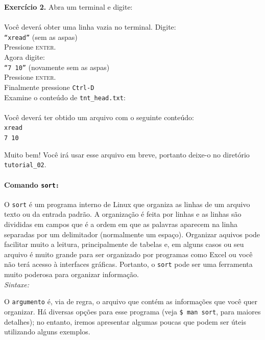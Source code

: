 \begin{refsection}
\begin{blackBlock}{\textbf{Exercício 2.}}
Abra um terminal e digite:\\
\\

Você deverá obter uma linha vazia no terminal. Digite:\\
\texttt{``xread''} (sem as aspas)\\
Pressione \textsc{enter}.\\
Agora digite:\\
\texttt{``7 10''} (novamente sem as aspas)\\
Pressione \textsc{enter}.\\
Finalmente pressione  \texttt{Ctrl-D}\\

Examine o conteúdo de \texttt{tnt\_head.txt}:\\
\\

Você deverá ter obtido um arquivo com o seguinte conteúdo:\\
\texttt{xread}\\
\texttt{7 10}\\
\end{blackBlock}

Muito bem! Você irá usar esse arquivo em breve, portanto deixe-o no diretório \texttt{tutorial\_02}.\\

\paragraph{Comando \texttt{sort:}}\label{tut2:text:editors:texttools:sort}
O \texttt{sort} é um programa interno de Linux que organiza as linhas de um arquivo texto ou da entrada padrão. A organização é feita por linhas e as linhas são divididas em campos que é a ordem em que as palavras aparecem na linha separadas por um delimitador (normalmente um espaço). Organizar aquivos pode facilitar muito a leitura, principalmente de tabelas e, em alguns casos ou seu arquivo é muito grande para ser organizado por programas como Excel ou você não terá acesso à interfaces gráficas. Portanto, o \texttt{sort} pode ser uma ferramenta muito poderosa para organizar informação.\\

\textit{Sintaxe:}\\

O \texttt{argumento} é, via de regra, o arquivo que contém as informações que você quer organizar. Há diversas opções para esse programa (veja \texttt{\$ man sort}, para maiores detalhes); no entanto, iremos apresentar algumas poucas que podem ser úteis utilizando alguns exemplos.\\


\end{refsection}
